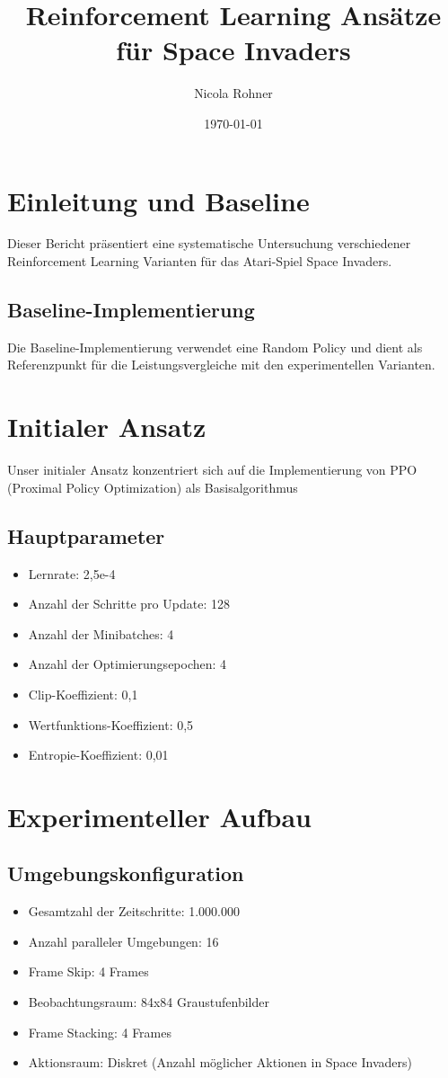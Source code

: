 \documentclass{article}
\title{Reinforcement Learning Ansätze für Space Invaders}
\author{Nicola Rohner}
\date{\today}
\begin{document}
\maketitle

\section{Einleitung und Baseline}
Dieser Bericht präsentiert eine systematische Untersuchung verschiedener Reinforcement Learning Varianten für das Atari-Spiel Space Invaders.

\subsection{Baseline-Implementierung}
Die Baseline-Implementierung verwendet eine Random Policy und dient als Referenzpunkt für die Leistungsvergleiche mit den experimentellen Varianten.


\section{Initialer Ansatz}
Unser initialer Ansatz konzentriert sich auf die Implementierung von PPO (Proximal Policy Optimization) als Basisalgorithmus

\subsection{Hauptparameter}
\begin{itemize}
    \item Lernrate: 2,5e-4
    \item Anzahl der Schritte pro Update: 128
    \item Anzahl der Minibatches: 4
    \item Anzahl der Optimierungsepochen: 4
    \item Clip-Koeffizient: 0,1
    \item Wertfunktions-Koeffizient: 0,5
    \item Entropie-Koeffizient: 0,01
\end{itemize}

\section{Experimenteller Aufbau}
\subsection{Umgebungskonfiguration}
\begin{itemize}
    \item Gesamtzahl der Zeitschritte: 1.000.000
    \item Anzahl paralleler Umgebungen: 16
    \item Frame Skip: 4 Frames
    \item Beobachtungsraum: 84x84 Graustufenbilder
    \item Frame Stacking: 4 Frames
    \item Aktionsraum: Diskret (Anzahl möglicher Aktionen in Space Invaders)
\end{itemize}
\end{document}
